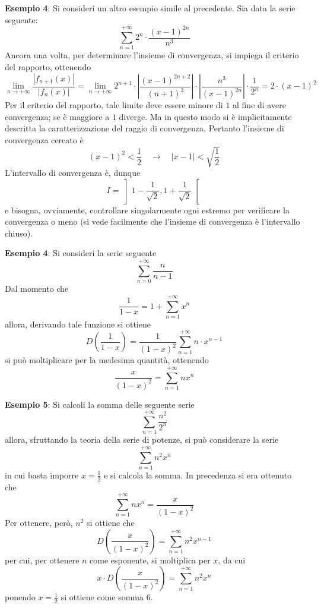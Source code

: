 \documentclass[a4paper]{extarticle}
\begin{document}
\vspace{2em}
\noindent
\textbf{Esempio 4}: Si consideri un altro esempio simile al precedente. Sia data la serie seguente:
\[\sum_{n=1}^{+\infty} 2^{n} \cdot \dfrac{(x-1)^{2n}}{n^3}\]
Ancora una volta, per determinare l'insieme di convergenza, si impiega il criterio del rapporto, ottenendo
\[\lim_{n \to +\infty} \dfrac{\left \vert f_{n+1}(x) \right \vert}{\left \vert f_n(x) \right \vert} = \lim_{n \to +\infty} 2^{n+1} \cdot \left \vert \dfrac{(x-1)^{2n+2}}{(n+1)^3} \right \vert \cdot \left \vert \dfrac{n^3}{(x-1)^{2n}} \right \vert \cdot \dfrac{1}{2^n} = 2 \cdot (x-1)^2\]
Per il criterio del rapporto, tale limite deve essere minore di $1$ al fine di avere convergenza; se è maggiore a $1$ diverge. Ma in questo modo si è implicitamente descritta la caratterizzazione del raggio di convergenza. Pertanto l'insieme di convergenza cercato è
\[(x-1)^2 < \dfrac{1}{2} \hspace{1em} \rightarrow \hspace{1em} \vert x-1 \vert < \sqrt{\dfrac{1}{2}}\]
L'intervallo di convergenza è, dunque
\[I=\left]1-\dfrac{1}{\sqrt{2}},1+\dfrac{1}{\sqrt{2}}\right[\]
e bisogna, ovviamente, controllare singolarmente ogni estremo per verificare la convergenza o meno (si vede facilmente che l'insieme di convergenza è l'intervallo chiuso).

\vspace{1em}
\noindent
\textbf{Esempio 4}: Si consideri la serie seguente
\[\sum_{n=0}^{+\infty} \frac{n}{n-1}\]
Dal momento che
\[\frac{1}{1-x} = 1 + \sum_{n=1}^{+\infty} x^n\]
allora, derivando tale funzione si ottiene
\[D \left(\frac{1}{1-x}\right) = \frac{1}{(1-x)^2} \sum_{n=1}^{+\infty} n \cdot x^{n-1}\]
si può moltiplicare per la medesima quantità, ottenendo
\[\frac{x}{(1-x)^2} = \sum_{n=1}^{+\infty} n x^n\]

\vspace{1em}
\noindent
\textbf{Esempio 5}: Si calcoli la somma delle seguente serie
\[\sum_{n=1}^{+\infty} \frac{n^2}{2^n}\]
allora, sfruttando la teoria della serie di potenze, si può considerare la serie
\[\sum_{n=1}^{+\infty} n^2 x^n\]
in cui basta imporre $x=\frac{1}{2}$ e si calcola la somma. In precedenza si era ottenuto che
\[\sum_{n=1}^{+\infty} n x^n = \frac{x}{(1-x)^2}\]
Per ottenere, però, $n^2$ si ottiene che
\[D \left(\frac{x}{(1-x)^2}\right) = \sum_{n=1}^{+\infty} n^2 x^{n-1}\]
per cui, per ottenere $n$ come esponente, si moltiplica per $x$, da cui
\[x \cdot D \left(\frac{x}{(1-x)^2}\right) = \sum_{n=1}^{+\infty} n^2 x^n\]
ponendo $x=\frac{1}{2}$ si ottiene come somma $6$.
\end{document}
